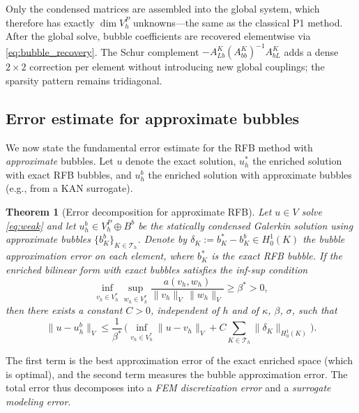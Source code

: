 \documentclass[11pt]{article}
\newcommand{\Th}{\mathcal{T}_h}
\newcommand{\Vh}{V_h}
\newcommand{\Vp}{V_h^P}
\newtheorem{theorem}{Theorem}[section]
\theoremstyle{remark}
\begin{document}
Only the condensed matrices are assembled into the global system, which therefore has exactly $\dim \Vp$ unknowns---the same as the classical P1 method. After the global solve, bubble coefficients are recovered elementwise via \eqref{eq:bubble_recovery}. The Schur complement $-A_{Lb}^K(A_{bb}^K)^{-1}A_{bL}^K$ adds a dense $2 \times 2$ correction per element without introducing new global couplings; the sparsity pattern remains tridiagonal.

\subsection{Error estimate for approximate bubbles}
\label{subsec:error_exact}

We now state the fundamental error estimate for the RFB method with \emph{approximate} bubbles. Let $u$ denote the exact solution, $u_h^*$ the enriched solution with exact RFB bubbles, and $u_h^b$ the enriched solution with approximate bubbles (e.g., from a KAN surrogate).

\begin{theorem}[Error decomposition for approximate RFB]
\label{thm:error_decomposition}
Let $u \in V$ solve \eqref{eq:weak} and let $u_h^b \in \Vp \oplus B^b$ be the statically condensed Galerkin solution using approximate bubbles $\{b_K^b\}_{K \in \Th}$. Denote by $\delta_K := b_K^* - b_K^b \in H_0^1(K)$ the bubble approximation error on each element, where $b_K^*$ is the exact RFB bubble. If the enriched bilinear form with exact bubbles satisfies the inf-sup condition
\begin{equation}
\inf_{v_h \in \Vh^*} \sup_{w_h \in \Vh^*} \frac{a(v_h, w_h)}{\|v_h\|_V\,\|w_h\|_V} \geq \beta^* > 0,
\end{equation}
then there exists a constant $C > 0$, independent of $h$ and of $\kappa$, $\beta$, $\sigma$, such that
\begin{equation}\label{eq:error_approx}
\|u - u_h^b\|_V \leq \frac{1}{\beta^*}\,\biggl(\inf_{v_h \in \Vh^*}\|u - v_h\|_V + C\sum_{K \in \Th}\|\delta_K\|_{H^1_0(K)}\biggr).
\end{equation}
\end{theorem}

The first term is the best approximation error of the exact enriched space (which is optimal), and the second term measures the bubble approximation error. The total error thus decomposes into a \emph{FEM discretization error} and a \emph{surrogate modeling error}.

\end{document}
